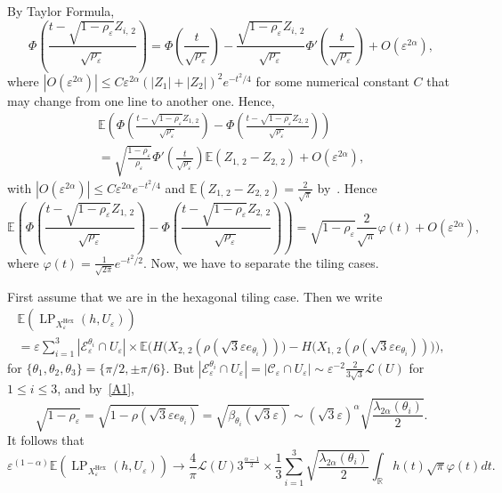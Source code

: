 \documentclass[AHL,Unicode,longabstracts,published]{cedram}
\newcommand{\R}{\mathbb{R}}
\newcommand{\E}{\mathbb{E}}
\newcommand{\eps}{\varepsilon}
\DeclareMathOperator{\LP}{LP}
\DeclareMathOperator{\Hex}{Hex}
\newcommand{\calL}{\mathcal{L}}
\newcommand{\calC}{\mathcal{C}}
\newcommand{\calE}{\mathcal{E}}
\begin{document}
By Taylor Formula,
\[
\Phi\left(\frac{t-\sqrt{1-\rho_\eps}Z_{i,\,2}}{\sqrt{\rho_\eps}}\right)
=\Phi\left(\frac{t}{\sqrt{\rho_\eps}}\right)-\frac{\sqrt{1-\rho_\eps}Z_{i,\,2}}{\sqrt{\rho_\eps}}\Phi'\left(\frac{t}{\sqrt{\rho_\eps}}\right)+O\left(\eps^{2\alpha}\right),
\]
where $|O(\eps^{2\alpha})|\le C\eps^{2\alpha}(|Z_{1}|+|Z_2|)^2e^{-t^2/4}$ for some numerical constant $C$ that may change from one line to another one. Hence,
\begin{multline*}
\E\left(\Phi\left(\frac{t-\sqrt{1-\rho_\eps}Z_{1,\,2}}{\sqrt{\rho_\eps}}\right)-\Phi\left(\frac{t-\sqrt{1-\rho_\eps}Z_{2,\,2}}{\sqrt{\rho_\eps}}\right)\right)\\
=\sqrt{\frac{1-\rho_\eps}{\rho_\eps}}\Phi'\left(\frac{t}{\sqrt{\rho_\eps}}\right)\E\left(Z_{1,\,2}-Z_{2,\,2}\right)+O\left(\eps^{2\alpha}\right),
\end{multline*}
with $|O(\eps^{2\alpha})|\le C\eps^{2\alpha}e^{-t^2/4}$ and $\E(Z_{1,\,2}-Z_{2,\,2})=\tfrac{2}{\sqrt{\pi}}$ by~\cite[p.~96]{Nevzorov}. Hence
\[
\E\left(\Phi\left(\frac{t-\sqrt{1-\rho_\eps}Z_{1,\,2}}{\sqrt{\rho_\eps}}\right)-\Phi\left(\frac{t-\sqrt{1-\rho_\eps}Z_{2,\,2}}{\sqrt{\rho_\eps}}\right)\right)
=\sqrt{1-\rho_\eps}\frac{2}{\sqrt{\pi}}\varphi(t)+O\left(\eps^{2\alpha}\right),
\]
where $\varphi(t)=\tfrac{1}{\sqrt{2\pi}}e^{-t^2/2}$. Now, we have to separate the tiling cases.


First assume that we are in the hexagonal tiling case. Then we write
\begin{multline*}
\E\left(\LP_{X_\eps^{\Hex}}(h,U_\eps)\right)\\
=\eps\sum_{i=1}^3|\calE_\eps^{\theta_i}\cap
U_\eps|\times
\E\bigg(H\Big(X_{2,\,2}\left(\rho\left(\sqrt{3}\eps e_{\theta_i}\right)\right)\Big) - H\Big(X_{1,\,2}\left(\rho\left(\sqrt{3}\eps e_{\theta_i}\right)\right)\Big)\bigg),
\end{multline*}
for $\{\theta_1,\theta_2,\theta_3\}=\{\pi/2,\pm \pi/6\}$. But $|\calE_\eps^{\theta_i}\cap U_\eps|=|\calC_\eps\cap U_\eps|\sim \eps^{-2}\frac{2}{3\sqrt{3}}{\calL}(U)$ for $1\le i\le 3$, and by~\eqref{A1},
\[
\sqrt{1-\rho_\eps}=\sqrt{1-\rho\left(\sqrt{3}\eps e_{\theta_i}\right)}=\sqrt{\beta_{\theta_i}\left(\sqrt{3}\eps\right)}\sim \left(\sqrt{3}\eps\right)^\alpha\sqrt{\frac{\lambda_{{2\alpha}}(\theta_i)}{2}}.
\]
It follows that
\[
\eps^{(1-\alpha)}\E\left(\LP_{X_\eps^{\Hex}}(h,U_\eps)\right)\longrightarrow \frac{4}{{\pi}}{\calL}(U)
{3}^{\frac{\alpha-1}{2}}\times\frac{1}{3}\sum_{i=1}^3\sqrt{\frac{\lambda_{{2\alpha}}(\theta_i)}{2}}\int_\R h(t){\sqrt{\pi}}\varphi(t)dt.
\]
\end{document}
